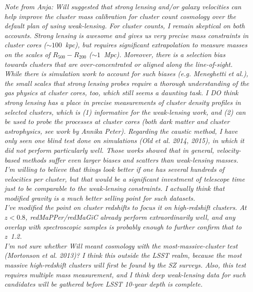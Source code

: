 {\it Note from Anja:  Will suggested that strong lensing and/or galaxy velocities can help improve the cluster mass calibration for cluster count cosmology over the default plan of using weak-lensing.  For cluster counts, I remain skeptical on both accounts. Strong lensing is awesome and gives us very precise mass constraints in cluster cores ($\sim 100$~kpc), but requires significant extrapolation to measure masses on the scales of $R_{500} - R_{200}$ ($\sim 1$~Mpc).  Moreover, there is a selection bias towards clusters that are over-concentrated or aligned along the line-of-sight.  While there is simulation work to account for such biases (e.g. Meneghetti et al.), the small scales that strong lensing probes require a thorough understanding of the gas physics at cluster cores, too, which still seems a daunting task.  I DO think strong lensing has a place in precise measurements of cluster density profiles in selected clusters, which is (1) informative for the weak-lensing work, and (2) can be used to probe the processes at cluster cores (both dark matter and cluster astrophysics, see work by Annika Peter).  Regarding the caustic method, I have only seen one blind test done on simulations (Old et al. 2014, 2015), in which it did not perform particularly well.  Those works showed that in general, velocity-based methods suffer even larger biases and scatters than weak-lensing masses.  I'm willing to believe that things look better if one has several hundreds of velocities per cluster, but that would be a significant investment of telescope time just to be comparable to the weak-lensing constraints.  I actually think that modified gravity is a much better selling point for such datasets.\\
I've modified the point on cluster redshifts to focus it on high-redshift clusters.  At $z<0.8$, redMaPPer/redMaGiC already perform extraordinarily well, and any overlap with spectroscopic samples is probably enough to further confirm that to z~1.2.\\
I'm not sure whether Will meant cosmology with the most-massive-cluster test (Mortonson et al. 2013)?  I think this outside the LSST realm, because the most massive high-redshift clusters will first be found by the SZ surveys.  Also, this test requires multiple mass measurement, and I think deep weak-lensing data for such candidates will be gathered before LSST 10-year depth is complete.}


